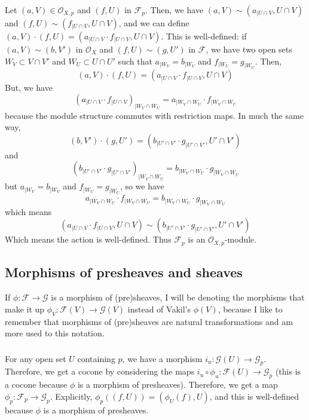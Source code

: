 \documentclass{article}
\newcommand{\Osheaf}{\mathscr{O}}
\newcommand{\Fsheaf}{\mathscr{F}}
\newcommand{\Gsheaf}{\mathscr{G}}
\newcommand{\exercise}{\subsubsection} %
\begin{document}
\exercise{} Let $(a,V) \in \Osheaf_{X,p}$ and $(f,U)$ in $\Fsheaf_p$. Then, we have $(a,V) \sim (a_{\mid U \cap V},U \cap V)$ and $(f,U) \sim (f_{\mid U\cap V}, U\cap V)$, and we can define $(a,V) \cdot (f,U) = (a_{\mid U\cap V} \cdot f_{\mid U \cap V}, U \cap V)$. This is well-defined: if $(a,V) \sim (b,V')$ in $\Osheaf_X$ and $(f,U) \sim (g,U')$ in $\Fsheaf$, we have two open sets $W_V \subset V \cap V'$ and $W_U \subset U \cap U'$ such that $a_{\mid W_V} = b_{\mid W_V}$ and $f_{\mid W_U} = g_{\mid W_U}$. Then,
\[(a, V) \cdot (f,U) = (a_{\mid U \cap V} \cdot f_{\mid U \cap V}, U \cap V)\]
But, we have
\[(a_{\mid U \cap V} \cdot f_{\mid U \cap V})_{\mid W_V \cap W_U} = a_{\mid W_V \cap W_U} \cdot f_{\mid W_V \cap W_U}\]
because the module structure commutes with restriction maps. In much the same way,
\[(b, V') \cdot (g,U') = (b_{\mid U' \cap V'} \cdot g_{\mid U' \cap V'}, U' \cap V')\]
and
\[(b_{\mid U' \cap V'} \cdot g_{\mid U' \cap V'})_{\mid W_V \cap W_U} = b_{\mid W_V \cap W_U} \cdot g_{\mid W_V \cap W_U}\]
but $a_{\mid W_V} = b_{\mid W_V}$ and $f_{\mid W_U} = g_{\mid W_U}$, so we have
\[a_{\mid W_V \cap W_U} \cdot f_{\mid W_V \cap W_U} = b_{\mid W_V \cap W_U} \cdot g_{\mid W_V \cap W_U}\]
which means
\[(a_{\mid U \cap V} \cdot f_{\mid U \cap V}, U \cap V) \sim (b_{\mid U' \cap V'} \cdot g_{\mid U' \cap V'}, U' \cap V')\]
Which means the action is well-defined. Thus $\Fsheaf_p$ is an $\Osheaf_{X,p}$-module.

\subsection{Morphisms of presheaves and sheaves}

If $\phi : \Fsheaf \to \Gsheaf$ is a morphism of (pre)sheaves, I will be denoting the morphisms that make it up $\phi_V : \Fsheaf(V) \to \Gsheaf(V)$ instead of Vakil's $\phi(V)$, because I like to remember that morphisms of (pre)sheaves are natural transformations and am more used to this notation.

\exercise{} For any open set $U$ containing $p$, we have a morphism $i_u : \Gsheaf(U) \to \Gsheaf_p$. Therefore, we get a cocone by considering the maps $i_u \circ \phi_u : \Fsheaf(U) \to \Gsheaf_p$ (this is a cocone because $\phi$ is a morphism of presheaves). Therefore, we get a map $\phi_p : \Fsheaf_p \to \Gsheaf_p$. Explicitly, $\phi_p ((f,U)) = (\phi_U(f),U)$, and this is well-defined because $\phi$ is a morphism of presheaves.
\end{document}

